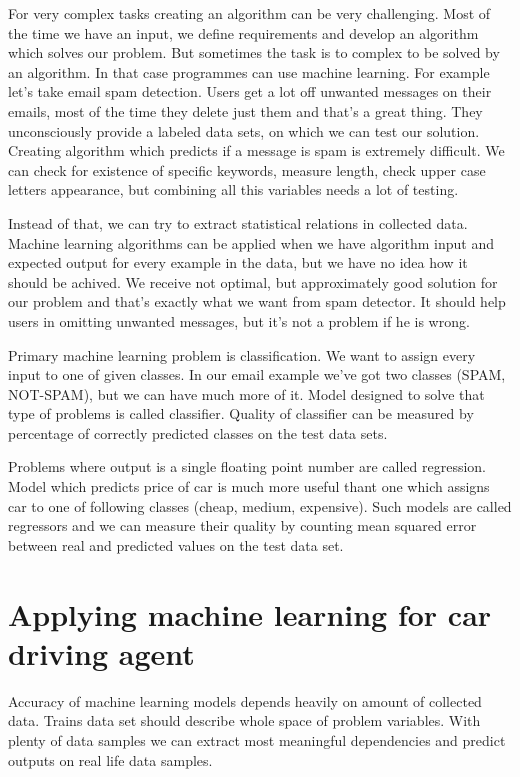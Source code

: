 \documentclass[declaration,shortabstract,english,inz]{iithesis}
\begin{document}
For very complex tasks creating an algorithm can be very challenging.
 Most of the time we have an input, we define requirements and develop an algorithm which solves our problem. But sometimes the task is to complex to be solved by an algorithm. In that case programmes can use machine learning. For example let's take email spam detection. Users get a lot off unwanted messages on their emails, most of the time they delete just them and that's a great thing. They unconsciously provide a labeled data sets, on which we can test our solution. Creating algorithm which predicts if a message is spam is extremely difficult. We can check for existence of specific keywords, measure length, check upper case letters appearance, but combining all this variables needs a lot of testing.

 Instead of that, we can try to extract statistical relations in collected data. Machine learning algorithms can be applied when we have algorithm input and expected output for every example in the data, but we have no idea how it should be achived. We receive not optimal, but approximately good solution for our problem and that's exactly what we want from spam detector. It should help users in omitting unwanted messages, but it's not a problem if he is wrong.

 Primary machine learning problem is classification. We want to assign every input to one of given classes. In our email example we've got two classes (SPAM, NOT-SPAM), but we can have much more of it. Model designed to solve that type of problems is called classifier. Quality of classifier can be measured by percentage of correctly predicted classes on the test data sets.

 Problems where output is a single floating point number are called regression. Model which predicts price of car is much more useful thant one which assigns car to one of following classes  (cheap, medium, expensive). Such models are called regressors and we can measure their quality by counting mean squared error between real and predicted values on the test data set.


\section{Applying machine learning for car driving agent}

Accuracy of machine learning models depends heavily on amount of collected data. Trains data set should describe whole space of problem variables. With plenty of data samples we can extract most meaningful dependencies and predict outputs on real life data samples. 
\end{document}
